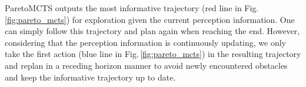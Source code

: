 ParetoMCTS outputs the most informative trajectory (red line in Fig.\,\ref{fig:pareto_mcts}) for exploration given the current perception information.
One can simply follow this trajectory and plan again when reaching the end.
However, considering that the perception information is continuously updating, we only take the first action (blue line in Fig.\,\ref{fig:pareto_mcts}) in the resulting trajectory and replan in a receding horizon manner to avoid newly encountered obstacles and keep the informative trajectory up to date.